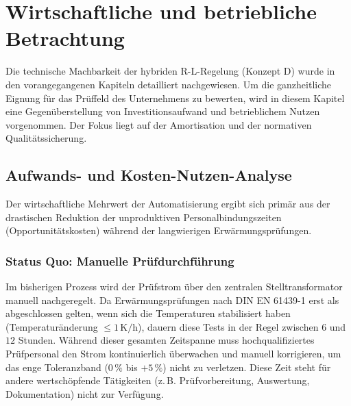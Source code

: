 
\section{Wirtschaftliche und betriebliche Betrachtung}
\label{chap:wirtschaftlichkeit}

Die technische Machbarkeit der hybriden R-L-Regelung (Konzept D) wurde in den vorangegangenen Kapiteln detailliert nachgewiesen. Um die ganzheitliche Eignung für das Prüffeld des Unternehmens zu bewerten, wird in diesem Kapitel eine Gegenüberstellung von Investitionsaufwand und betrieblichem Nutzen vorgenommen. Der Fokus liegt auf der Amortisation und der normativen Qualitätssicherung.
\subsection{Aufwands- und Kosten-Nutzen-Analyse}
\label{sec:kosten_nutzen}

Der wirtschaftliche Mehrwert der Automatisierung ergibt sich primär aus der drastischen Reduktion der unproduktiven Personalbindungszeiten (Opportunitätskosten) während der langwierigen Erwärmungsprüfungen.
\subsubsection{Status Quo: Manuelle Prüfdurchführung}
Im bisherigen Prozess wird der Prüfstrom über den zentralen Stelltransformator manuell nachgeregelt. Da Erwärmungsprüfungen nach DIN EN 61439-1 erst als abgeschlossen gelten, wenn sich die Temperaturen stabilisiert haben (Temperaturänderung $\le 1\,\text{K/h}$), dauern diese Tests in der Regel zwischen $6$ und $12$ Stunden. Während dieser gesamten Zeitspanne muss hochqualifiziertes Prüfpersonal den Strom kontinuierlich überwachen und manuell korrigieren, um das enge Toleranzband ($0\,\%$ bis $+5\,\%$) nicht zu verletzen. Diese Zeit steht für andere wertschöpfende Tätigkeiten (z.\,B. Prüfvorbereitung, Auswertung, Dokumentation) nicht zur Verfügung.
